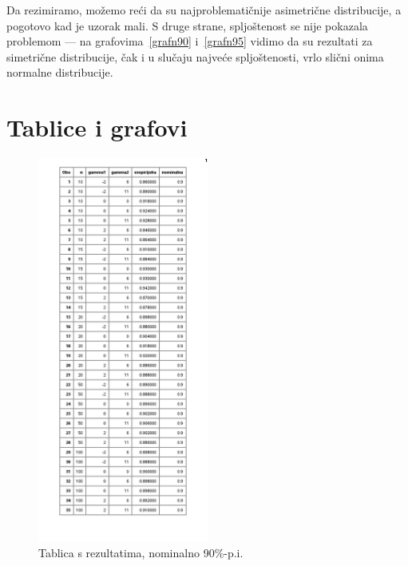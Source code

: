 \documentclass[11pt]{scrartcl}
\begin{document}
Da rezimiramo, možemo reći da su najproblematičnije asimetrične distribucije, a pogotovo
kad je uzorak mali. S druge strane, spljoštenost se nije pokazala problemom --- na grafovima~\ref{grafn90}
i~\ref{grafn95} vidimo da su rezultati za simetrične distribucije, čak i u slučaju
najveće spljoštenosti, vrlo slični onima normalne distribucije.

\section{Tablice i grafovi}
\begin{figure}[h]
	\centering
	\includegraphics[width=0.5\textwidth]{assets/tablica90.png}
	\caption{Tablica s rezultatima, nominalno 90\%-p.i.}
	\label{tablica90}
\end{figure}
\end{document}

